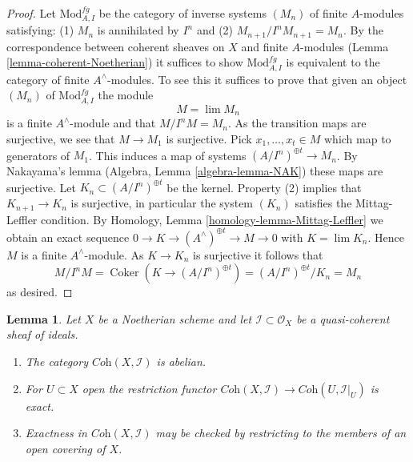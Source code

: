 \documentclass{stacks-project}
\theoremstyle{plain}
\newtheorem{lemma}[subsection]{Lemma}
\theoremstyle{definition}
\theoremstyle{remark}
\numberwithin{equation}{subsection}
\def\lim{\mathop{\mathrm{lim}}\nolimits}
\def\Coker{\mathop{\mathrm{Coker}}}
\begin{document}
\begin{proof}
Let $\text{Mod}^{fg}_{A, I}$ be the category of inverse systems $(M_n)$
of finite $A$-modules satisfying: (1) $M_n$ is annihilated by $I^n$ and (2)
$M_{n + 1}/I^nM_{n + 1} = M_n$. By the correspondence between coherent
sheaves on $X$ and finite $A$-modules (Lemma \ref{lemma-coherent-Noetherian})
it suffices to show $\text{Mod}^{fg}_{A, I}$ is equivalent to the category of
finite $A^\wedge$-modules. To see this it suffices to prove that given
an object $(M_n)$ of $\text{Mod}^{fg}_{A, I}$ the module
$$
M = \lim M_n
$$
is a finite $A^\wedge$-module and that $M/I^nM = M_n$. As the transition
maps are surjective, we see that $M \to M_1$ is surjective.
Pick $x_1, \ldots, x_t \in M$ which map to generators of $M_1$.
This induces a map of systems $(A/I^n)^{\oplus t} \to M_n$.
By Nakayama's lemma (Algebra, Lemma \ref{algebra-lemma-NAK}) these maps are
surjective. Let $K_n \subset (A/I^n)^{\oplus t}$ be the kernel.
Property (2) implies that $K_{n + 1} \to K_n$ is surjective, in particular
the system $(K_n)$ satisfies the Mittag-Leffler condition.
By Homology, Lemma \ref{homology-lemma-Mittag-Leffler}
we obtain an exact sequence
$0 \to K \to (A^\wedge)^{\oplus t} \to M \to 0$
with $K = \lim K_n$.
Hence $M$ is a finite $A^\wedge$-module.
As $K \to K_n$ is surjective it follows that
$$
M/I^nM = \Coker(K \to (A/I^n)^{\oplus t}) =
(A/I^n)^{\oplus t}/K_n = M_n
$$
as desired.
\end{proof}

\begin{lemma}
\label{lemma-inverse-systems-abelian}
Let $X$ be a Noetherian scheme and let $\mathcal{I} \subset \mathcal{O}_X$
be a quasi-coherent sheaf of ideals.
\begin{enumerate}
\item The category $\textit{Coh}(X, \mathcal{I})$ is abelian.
\item For $U \subset X$ open the restriction functor
$\textit{Coh}(X, \mathcal{I}) \to \textit{Coh}(U, \mathcal{I}|_U)$
is exact.
\item Exactness in $\textit{Coh}(X, \mathcal{I})$ may be checked by
restricting to the members of an open covering of $X$.
\end{enumerate}
\end{lemma}
\end{document}
